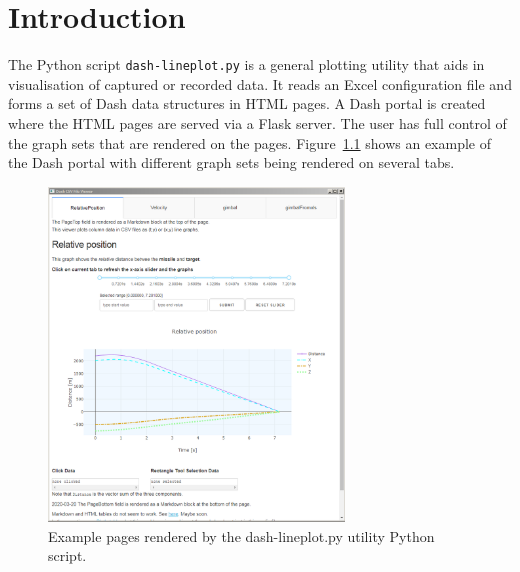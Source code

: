 


\chapter{Introduction}

The Python script \texttt{dash-lineplot.py} is a general plotting utility that aids in visualisation of captured or recorded data. It reads an Excel configuration file and forms a set of Dash data structures in \ac{HTML} pages. A Dash portal is created where the \ac{HTML} pages are served via a Flask server.
The user has full control of the graph sets that are rendered on the pages.
Figure~\ref{fig:examplePage} shows an example of the Dash portal with different graph sets being rendered on several tabs.


\begin{figure}[h]
\centering
\includegraphics[width=0.70\textwidth]{pic/examplePage}
\caption{Example pages rendered by the dash-lineplot.py utility Python script.
\label{fig:examplePage}}
\end{figure}
